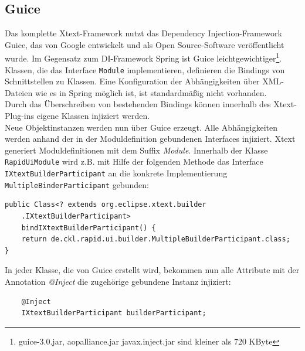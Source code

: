 \documentclass[a4paper,12pt]{scrreprt}
\begin{document}
\subsection{Guice}
Das komplette Xtext-Framework nutzt das Dependency Injection-Framework Guice, das von Google entwickelt und als Open Source-Software veröffentlicht wurde.
Im Gegensatz zum DI-Framework Spring ist Guice leichtgewichtiger\footnote{guice-3.0.jar, aopalliance.jar javax.inject.jar sind kleiner als 720 KByte}.
Klassen, die das Interface \verb+Module+ implementieren, definieren die Bindings von Schnittstellen zu Klassen. Eine Konfiguration der Abhängigkeiten über XML-Dateien wie es in Spring möglich ist, ist standardmäßig nicht vorhanden.\\
Durch das Überschreiben von bestehenden Bindings können innerhalb des Xtext-Plug-ins eigene Klassen injiziert werden.\\
Neue Objektinstanzen werden nun über Guice erzeugt. Alle Abhängigkeiten werden anhand der in der Moduldefinition gebundenen Interfaces injiziert.
Xtext generiert Moduldefinitionen mit dem Suffix \emph{Module}. Innerhalb der Klasse \verb+RapidUiModule+ wird z.B. mit Hilfe der folgenden Methode das Interface \verb+IXtextBuilderParticipant+ an die konkrete Implementierung \verb+MultipleBinderParticipant+ gebunden:
\begin{verbatim}
public Class<? extends org.eclipse.xtext.builder
    .IXtextBuilderParticipant>
    bindIXtextBuilderParticipant() {
    return de.ckl.rapid.ui.builder.MultipleBuilderParticipant.class;
}
\end{verbatim}
In jeder Klasse, die von Guice erstellt wird, bekommen nun alle Attribute mit der Annotation \emph{@Inject} die zugehörige gebundene Instanz injiziert:
\begin{verbatim}
    @Inject
    IXtextBuilderParticipant builderParticipant;
\end{verbatim}
\end{document}
